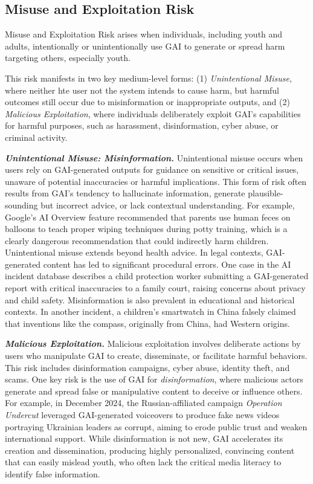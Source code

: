 \vspace{-8pt}
\subsection{Misuse and Exploitation Risk}
\begin{boxH}
Misuse and Exploitation Risk arises when individuals, including youth and adults, intentionally or unintentionally use GAI to generate or spread harm targeting others, especially youth.
\end{boxH}
This risk manifests in two key medium-level forms: (1) \textit{Unintentional Misuse}, where neither hte user not the system intends to cause harm, but harmful outcomes still occur due to misinformation or inappropriate outputs, and (2) \textit{Malicious Exploitation}, where individuals deliberately exploit GAI’s capabilities for harmful purposes, such as harassment, disinformation, cyber abuse, or criminal activity. 

\textbf{\textit{Unintentional Misuse: Misinformation.}}
Unintentional misuse occurs when users rely on GAI-generated outputs for guidance on sensitive or critical issues, unaware of potential inaccuracies or harmful implications. This form of risk often results from GAI’s tendency to hallucinate information, generate plausible-sounding but incorrect advice, or lack contextual understanding. For example, Google's AI Overview feature recommended that parents use human feces on balloons to teach proper wiping techniques during potty training, which is a clearly dangerous recommendation that could indirectly harm children. Unintentional misuse extends beyond health advice. In legal contexts, GAI-generated content has led to significant procedural errors. One case in the AI incident database describes a child protection worker submitting a GAI-generated report with critical inaccuracies to a family court, raising concerns about privacy and child safety. Misinformation is also prevalent in educational and historical contexts. In another incident, a children’s smartwatch in China falsely claimed that inventions like the compass, originally from China, had Western origins.

\textbf{\textit{Malicious Exploitation.}}
Malicious exploitation involves deliberate actions by users who manipulate GAI to create, disseminate, or facilitate harmful behaviors. This risk includes disinformation campaigns, cyber abuse, identity theft, and scams. One key risk is the use of GAI for \textit{disinformation}, where malicious actors generate and spread false or manipulative content to deceive or influence others. For example, in December 2024, the Russian-affiliated campaign \textit{Operation Undercut} leveraged GAI-generated voiceovers to produce fake news videos portraying Ukrainian leaders as corrupt, aiming to erode public trust and weaken international support. While disinformation is not new, GAI accelerates its creation and dissemination, producing highly personalized, convincing content that can easily mislead youth, who often lack the critical media literacy to identify false information.

